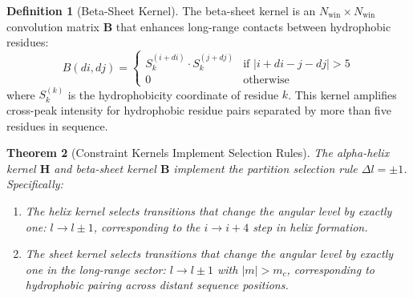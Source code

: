 \documentclass[11pt,twocolumn,a4paper]{article}
\newtheorem{theorem}{Theorem}[section]
\theoremstyle{definition}
\newtheorem{definition}[theorem]{Definition}
\theoremstyle{remark}
\newcommand{\Sk}{S_k}
\begin{document}
\begin{definition}[Beta-Sheet Kernel]
\label{def:sheet_kernel}
The beta-sheet kernel is an $N_{\text{win}} \times N_{\text{win}}$ convolution matrix $\mathbf{B}$ that enhances long-range contacts between hydrophobic residues:
\begin{equation}
B(di, dj) = \begin{cases}
\Sk^{(i+di)} \cdot \Sk^{(j+dj)} & \text{if } |i + di - j - dj| > 5 \\
0 & \text{otherwise}
\end{cases}
\end{equation}
where $\Sk^{(k)}$ is the hydrophobicity coordinate of residue $k$. This kernel amplifies cross-peak intensity for hydrophobic residue pairs separated by more than five residues in sequence.
\end{definition}

\begin{theorem}[Constraint Kernels Implement Selection Rules]
\label{thm:selection_rules}
The alpha-helix kernel $\mathbf{H}$ and beta-sheet kernel $\mathbf{B}$ implement the partition selection rule $\Delta l = \pm 1$. Specifically:
\begin{enumerate}
    \item The helix kernel selects transitions that change the angular level by exactly one: $l \to l \pm 1$, corresponding to the $i \to i+4$ step in helix formation.
    \item The sheet kernel selects transitions that change the angular level by exactly one in the long-range sector: $l \to l \pm 1$ with $|m| > m_c$, corresponding to hydrophobic pairing across distant sequence positions.
\end{enumerate}
\end{theorem}
\end{document}
